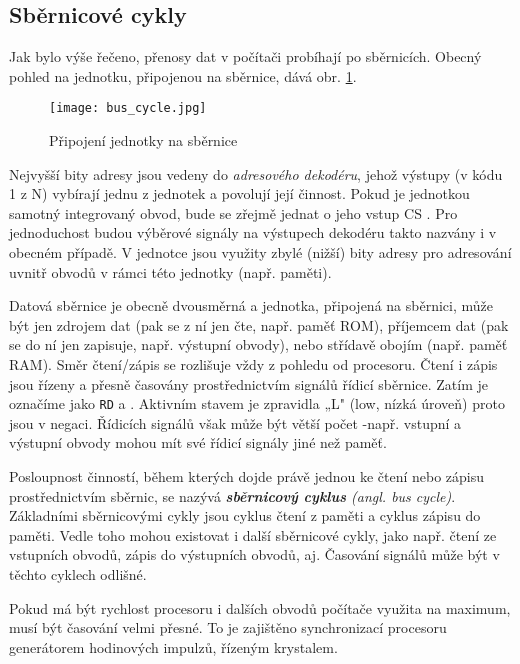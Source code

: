     \subsection{Sběrnicové cykly}
      Jak bylo výše řečeno, přenosy dat v počítači probíhají po sběrnicích. Obecný pohled na jednotku, 
      připojenou na sběrnice, dává obr. \ref{MIT:fig_bus_cycle}.
      \begin{figure}[ht!] %
        \centering
        \texttt{[image: bus\_cycle.jpg]}
        \caption{ Připojení jednotky na sběrnice}
        \label{MIT:fig_bus_cycle}
      \end{figure}

      Nejvyšší bity adresy jsou vedeny do \emph{adresového dekodéru}, jehož výstupy (v kódu 1 z N) vybírají 
      jednu z jednotek a povolují její činnost. Pokud je jednotkou samotný integrovaný obvod, bude se zřejmě 
      jednat o jeho vstup CS . Pro jednoduchost budou výběrové signály na výstupech dekodéru takto nazvány i 
      v obecném případě. V jednotce jsou využity zbylé (nižší) bity adresy pro adresování uvnitř obvodů v 
      rámci této jednotky (např. paměti).
      
      Datová sběrnice je obecně dvousměrná a jednotka, připojená na sběrnici, může být jen zdrojem dat (pak 
      se z ní jen čte, např. paměť ROM), příjemcem dat (pak se do ní jen zapisuje, např. výstupní obvody), 
      nebo střídavě obojím (např. paměť RAM). Směr čtení/zápis se rozlišuje vždy z pohledu od procesoru.
      Čtení i zápis jsou řízeny a přesně časovány prostřednictvím signálů řídicí sběrnice. Zatím je označíme 
      jako \texttt{RD} a  . Aktivním stavem je zpravidla „L" (low, nízká 
      úroveň) 
      proto jsou v negaci. Řídicích signálů však může být větší počet -např. vstupní a výstupní obvody mohou 
      mít své řídicí signály jiné než paměť.
      
      Posloupnost činností, během kterých dojde právě jednou ke čtení nebo zápisu prostřednictvím sběrnic, se 
      nazývá \emph{\textbf{sběrnicový cyklus} (angl. bus cycle)}. Základními sběrnicovými cykly jsou cyklus 
      čtení z paměti a cyklus zápisu do paměti. Vedle toho mohou existovat i další sběrnicové cykly, jako 
      např. čtení ze vstupních obvodů, zápis do výstupních obvodů, aj. Časování signálů může být v těchto 
      cyklech odlišné.
      
      Pokud má být rychlost procesoru i dalších obvodů počítače využita na maximum, musí být časování velmi 
      přesné. To je zajištěno synchronizací procesoru generátorem hodinových impulzů, řízeným krystalem.


